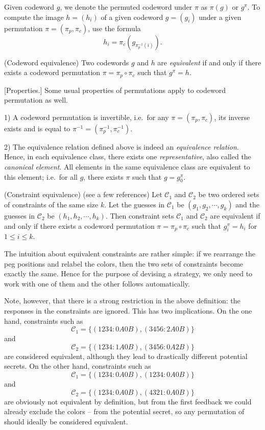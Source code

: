 Given codeword $g$, we denote the permuted codeword under $\pi$ as $\pi(g)$ or $g^\pi$. 
To compute the image $h = (h_i)$ of a given codeword $g = (g_i)$ under a given permutation $\pi = (\pi_p, \pi_c)$, use the formula
\[
h_i = \pi_c\left(g_{\pi_p^{-1}(i)}\right) .
\]

\begin{definition}
(Codeword equivalence) Two codewords $g$ and $h$ are \emph{equivalent} if and only if there exists a codeword permutation $\pi = \pi_p \circ \pi_c$ such that $g^\pi = h$.
\end{definition}

[Properties.] Some usual properties of permutations apply to codeword permutation as well.

1) A codeword permutation is invertible, i.e.\ for any $\pi = (\pi_p, \pi_c)$, its inverse exists and is equal to $\pi^{-1} = (\pi_p^{-1}, \pi_c^{-1})$.

2) The equivalence relation defined above is indeed an \emph{equivalence relation}. Hence, in each equivalence class, there exists one \emph{representative}, also called the \emph{canonical element}. All elements in the same equivalence class are equivalent to this element; i.e.\ for all $g$, there exists $\pi$ such that $g = g_0^\pi$.

\begin{definition}
(Constraint equivalence) (see a few references) Let $\mathcal{C}_1$ and $\mathcal{C}_2$ be two ordered sets of constraints of the same size $k$. Let the guesses in $\mathcal{C}_1$ be $(g_1,g_2,\cdots,g_k)$ and the guesses in $\mathcal{C}_2$ be $(h_1,h_2,\cdots,h_k)$. Then constraint sets $\mathcal{C}_1$ and $\mathcal{C}_2$ are equivalent if and only if there exists a codeword permutation $\pi = \pi_p \circ \pi_c$ such that
$g_i^\pi = h_i$ for $1 \le i \le k$.
\end{definition}

The intuition about equivalent constraints are rather simple: if we rearrange the peg positions and relabel the colors, then the two sets of constraints become exactly the same. Hence for the purpose of devising a strategy, we only need to work with one of them and the other follows automatically.

Note, however, that there is a strong restriction in the above definition: the responses in the constraints are ignored. This has two implications. On the one hand, constraints such as 
\[
\mathcal{C}_1 = \{ (1234:0A0B), (3456:2A0B) \}
\]
and
\[
\mathcal{C}_2 = \{ (1234:1A0B), (3456:0A2B) \}
\]
are considered equivalent, although they lead to drastically different potential secrets. On the other hand, constraints such as
\[
\mathcal{C}_1 = \{ (1234:0A0B), (1234:0A0B) \}
\]
and
\[
\mathcal{C}_2 = \{ (1234:0A0B), (4321:0A0B) \}
\]
are obviously not equivalent by definition, but from the first feedback  we could already exclude the colors  --  from the potential secret, so any permutation of  should ideally be considered equivalent.

